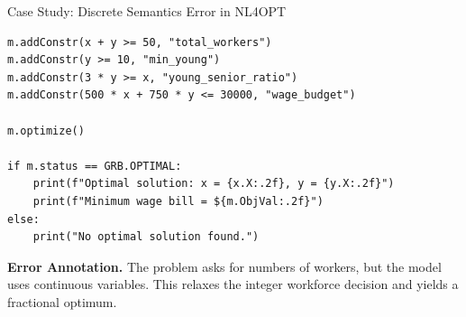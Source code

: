 \begin{casepage}{Case Study: Discrete Semantics Error in NL4OPT}
\begin{lstlisting}[style=pythoncase]
m.addConstr(x + y >= 50, "total_workers")
m.addConstr(y >= 10, "min_young")
m.addConstr(3 * y >= x, "young_senior_ratio")
m.addConstr(500 * x + 750 * y <= 30000, "wage_budget")

m.optimize()

if m.status == GRB.OPTIMAL:
    print(f"Optimal solution: x = {x.X:.2f}, y = {y.X:.2f}")
    print(f"Minimum wage bill = ${m.ObjVal:.2f}")
else:
    print("No optimal solution found.")
\end{lstlisting}

\vspace{0.3em}
\textbf{Error Annotation.}
The problem asks for numbers of workers, but the model uses continuous variables.
This relaxes the integer workforce decision and yields a fractional optimum.

\end{casepage}

